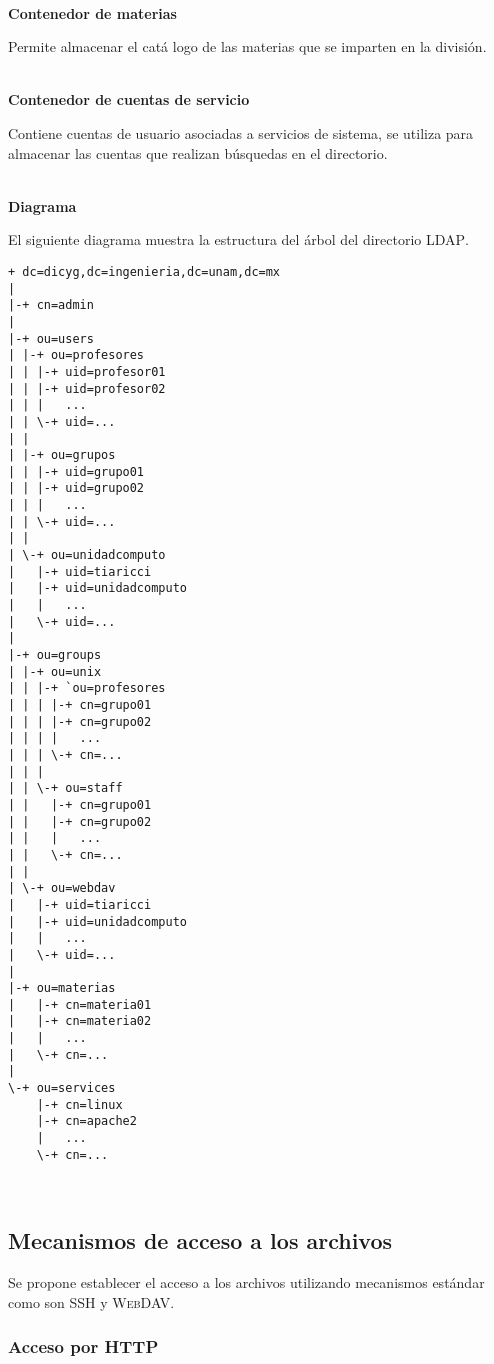 \textbf{\\ Contenedor de materias \\}

Permite almacenar el cat\'{a} logo de las materias que se imparten en la divisi\'{o}n.

\textbf{\\ Contenedor de cuentas de servicio \\}

Contiene cuentas de usuario asociadas a servicios de sistema, se utiliza para almacenar las cuentas que realizan b\'{u}squedas en el directorio.

\textbf{\\ Diagrama \\}

El siguiente diagrama muestra la estructura del \'{a}rbol del directorio \textsc{LDAP}.

{
\scriptsize
\linespread{1}
\begin{verbatim}
+ dc=dicyg,dc=ingenieria,dc=unam,dc=mx
|
|-+ cn=admin
|
|-+ ou=users
| |-+ ou=profesores
| | |-+ uid=profesor01
| | |-+ uid=profesor02
| | |   ...
| | \-+ uid=...
| |
| |-+ ou=grupos
| | |-+ uid=grupo01
| | |-+ uid=grupo02
| | |   ...
| | \-+ uid=...
| |
| \-+ ou=unidadcomputo
|   |-+ uid=tiaricci
|   |-+ uid=unidadcomputo
|   |   ...  
|   \-+ uid=...
|  
|-+ ou=groups
| |-+ ou=unix
| | |-+ `ou=profesores
| | | |-+ cn=grupo01
| | | |-+ cn=grupo02
| | | |   ...
| | | \-+ cn=...
| | |
| | \-+ ou=staff
| |   |-+ cn=grupo01
| |   |-+ cn=grupo02
| |   |   ...
| |   \-+ cn=...
| |  
| \-+ ou=webdav
|   |-+ uid=tiaricci
|   |-+ uid=unidadcomputo
|   |   ...  
|   \-+ uid=...
|
|-+ ou=materias
|   |-+ cn=materia01
|   |-+ cn=materia02
|   |   ...
|   \-+ cn=...
|
\-+ ou=services
    |-+ cn=linux
    |-+ cn=apache2
    |   ...
    \-+ cn=...
\end{verbatim}
}
\

      \subsection {Mecanismos de acceso a los archivos}

Se propone establecer el acceso a los archivos utilizando mecanismos est\'{a}ndar como son \textsc{SSH} y \textsc{WebDAV}.

        \subsubsection {Acceso por HTTP}

